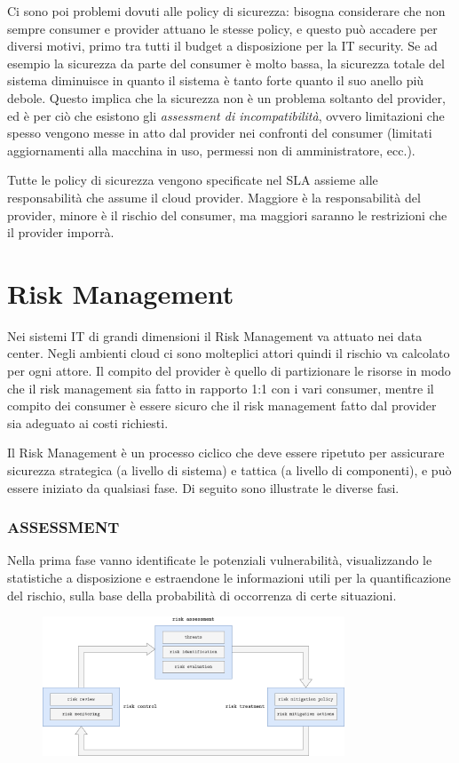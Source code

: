 Ci sono poi problemi dovuti alle policy di sicurezza: bisogna considerare che non sempre consumer e provider attuano le stesse policy, e questo può accadere per diversi motivi, primo tra tutti il budget a disposizione per la IT security. Se ad esempio la sicurezza da parte del consumer è molto bassa, la sicurezza totale del sistema diminuisce in quanto il sistema è tanto forte quanto il suo anello più debole. Questo implica che la sicurezza non è un problema soltanto del provider, ed è per ciò che esistono gli \textit{assessment di incompatibilità}, ovvero limitazioni che spesso vengono messe in atto dal provider nei confronti del consumer (limitati aggiornamenti alla macchina in uso, permessi non di amministratore, ecc.).

Tutte le policy di sicurezza vengono specificate nel SLA assieme alle responsabilità che assume il cloud provider. Maggiore è la responsabilità del provider, minore è il rischio del consumer, ma maggiori saranno le restrizioni che il provider imporrà. 

\section{Risk Management}
Nei sistemi IT di grandi dimensioni il Risk Management va attuato nei data center. Negli ambienti cloud ci sono molteplici attori quindi il rischio va calcolato per ogni attore. Il compito del provider è quello di partizionare le risorse in modo che il risk management sia fatto in rapporto 1:1 con i vari consumer, mentre il compito dei consumer è essere sicuro che il risk management fatto dal provider sia adeguato ai costi richiesti. 

Il Risk Management è un processo ciclico che deve essere ripetuto per assicurare sicurezza strategica (a livello di sistema) e tattica (a livello di componenti), e può essere iniziato da qualsiasi fase. Di seguito sono illustrate le diverse fasi.

\subsubsection{\textbf{ASSESSMENT}}
Nella prima fase vanno identificate le potenziali vulnerabilità, visualizzando le statistiche a disposizione e estraendone le informazioni utili per la quantificazione del rischio, sulla base della probabilità di occorrenza di certe situazioni.

\begin{figure}[htb!]
    \centering
    \includegraphics[width=9cm]{./Images/cap7/7.3.png}
\end{figure}

